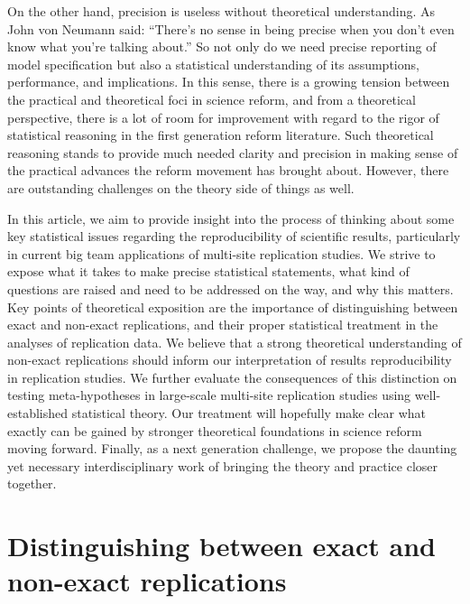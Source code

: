 \documentclass[meta,authordate,issue]{jote-new-article}
\newcounter{result}
\begin{document}
On the other hand, precision is useless without theoretical understanding. As John von Neumann said: ``There's no sense in being precise when you don't even know what you're talking about.'' So not only do we need precise reporting of model specification but also a statistical understanding of its assumptions, performance, and implications. In this sense, there is a growing tension between the practical and theoretical foci in science reform, and from a theoretical perspective, there is a lot of room for improvement with regard to the rigor of statistical reasoning in the first generation reform literature. Such theoretical reasoning stands to provide much needed clarity and precision in making sense of the practical advances the reform movement has brought about. However, there are outstanding challenges on the theory side of things as well.

In this article, we aim to provide insight into the process of thinking about some key statistical issues regarding the reproducibility of scientific results, particularly in current big team applications of multi-site replication studies. We strive to expose what it takes to make precise statistical statements, what kind of questions are raised and need to be addressed on the way, and why this matters. Key points of theoretical exposition are the importance of distinguishing between exact and non-exact replications, and their proper statistical treatment in the analyses of replication data. We believe that a strong theoretical understanding of non-exact replications should inform our interpretation of results reproducibility in replication studies. We further evaluate the consequences of this distinction on testing meta-hypotheses in large-scale multi-site replication studies using well-established statistical theory. Our treatment will hopefully make clear what exactly can be gained by stronger theoretical foundations in science reform moving forward. Finally, as a next generation challenge, we propose the daunting yet necessary interdisciplinary work of bringing the theory and practice closer together.

\section{Distinguishing between exact and non-exact replications}
\end{document}
